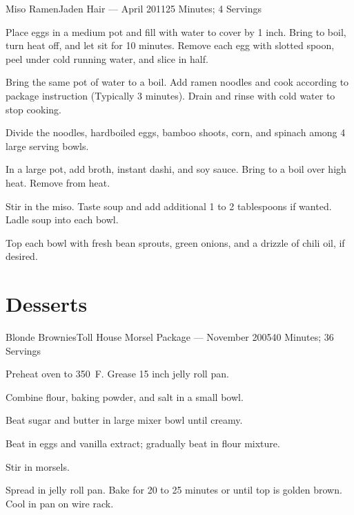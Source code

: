\documentclass{article}
\begin{document}
\begin{recipe}{Miso Ramen}{Jaden Hair --- April 2011}{25 Minutes; 4 Servings}

    Place eggs in a medium pot and fill with water to cover by 1 inch. Bring to boil, turn heat off, and let sit for 10 minutes. Remove each egg with slotted spoon, peel under cold running water, and slice in half. 

    Bring the same pot of water to a boil. Add ramen noodles and cook according to package instruction (Typically 3 minutes). Drain and rinse with cold water to stop cooking.

    Divide the noodles, hardboiled eggs, bamboo shoots, corn, and spinach among 4 large serving bowls.

    In a large pot, add broth, instant dashi, and soy sauce. Bring to a boil over high heat. Remove from heat.

    Stir in the miso. Taste soup and add additional 1 to 2 tablespoons if wanted. Ladle soup into each bowl.

    Top each bowl with fresh bean sprouts, green onions, and a drizzle of chili oil, if desired.

\end{recipe}


\section{Desserts}

\begin{recipe}{Blonde Brownies}{Toll House Morsel Package --- November 2005}{40 Minutes; 36 Servings}

   \newstep
   Preheat oven to 350\ \0F. Grease 15 inch jelly roll pan.

   Combine flour, baking powder, and salt in a small bowl.

   Beat sugar and butter in large mixer bowl until creamy.

   Beat in eggs and vanilla extract; gradually beat in flour mixture.

   Stir in morsels.

   \newstep
   Spread in jelly roll pan.  Bake for 20 to 25 minutes or until top is golden brown.  Cool in pan on wire rack.

\end{recipe}
\end{document}
